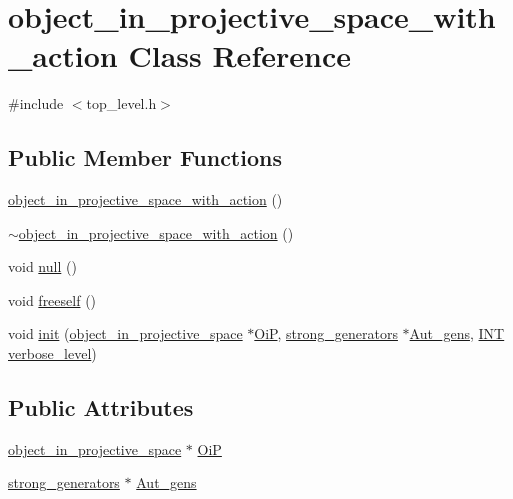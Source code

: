 \hypertarget{classobject__in__projective__space__with__action}{}\section{object\+\_\+in\+\_\+projective\+\_\+space\+\_\+with\+\_\+action Class Reference}
\label{classobject__in__projective__space__with__action}


{\ttfamily \#include $<$top\+\_\+level.\+h$>$}

\subsection*{Public Member Functions}
\begin{DoxyCompactItemize}
\item 
\mbox{\hyperlink{classobject__in__projective__space__with__action_a9cff112580212dbd7075c024d287e73c}{object\+\_\+in\+\_\+projective\+\_\+space\+\_\+with\+\_\+action}} ()
\item 
\mbox{\hyperlink{classobject__in__projective__space__with__action_a287c29d37fafb8ac864cac5a71f396f7}{$\sim$object\+\_\+in\+\_\+projective\+\_\+space\+\_\+with\+\_\+action}} ()
\item 
void \mbox{\hyperlink{classobject__in__projective__space__with__action_a565424e27d5fee98d45489b9e32f524e}{null}} ()
\item 
void \mbox{\hyperlink{classobject__in__projective__space__with__action_a66ef4903c1e026253c60b479b6dbede3}{freeself}} ()
\item 
void \mbox{\hyperlink{classobject__in__projective__space__with__action_af4fa723123784e6b61c8b8aa3151a5ed}{init}} (\mbox{\hyperlink{classobject__in__projective__space}{object\+\_\+in\+\_\+projective\+\_\+space}} $\ast$\mbox{\hyperlink{classobject__in__projective__space__with__action_ac16d8f23e9708ad963d6c3b2161a8dc4}{OiP}}, \mbox{\hyperlink{classstrong__generators}{strong\+\_\+generators}} $\ast$\mbox{\hyperlink{classobject__in__projective__space__with__action_ad98901ff5cf5ee6e3ca20d593796f901}{Aut\+\_\+gens}}, \mbox{\hyperlink{galois_8h_a09fddde158a3a20bd2dcadb609de11dc}{I\+NT}} \mbox{\hyperlink{simeon_8_c_a818073fbcc2f439e7c56952f67386122}{verbose\+\_\+level}})
\end{DoxyCompactItemize}
\subsection*{Public Attributes}
\begin{DoxyCompactItemize}
\item 
\mbox{\hyperlink{classobject__in__projective__space}{object\+\_\+in\+\_\+projective\+\_\+space}} $\ast$ \mbox{\hyperlink{classobject__in__projective__space__with__action_ac16d8f23e9708ad963d6c3b2161a8dc4}{OiP}}
\item 
\mbox{\hyperlink{classstrong__generators}{strong\+\_\+generators}} $\ast$ \mbox{\hyperlink{classobject__in__projective__space__with__action_ad98901ff5cf5ee6e3ca20d593796f901}{Aut\+\_\+gens}}
\end{DoxyCompactItemize}


